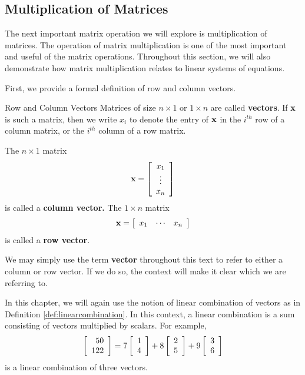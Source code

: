 \subsection{Multiplication of Matrices}

The next important matrix operation we will explore is multiplication
of matrices. The
operation of matrix multiplication is one of the most important and
useful of the matrix operations.  Throughout this section, we will
also demonstrate how matrix multiplication relates to linear systems
of equations.

First, we provide a formal definition of row and column vectors. 

\begin{definition}{Row and Column Vectors}\label{def:rowandcolumnvectors}
Matrices of size $n\times 1$ or $1\times n$ are called \textbf{vectors}. If $\mathbf{x}$ is such a matrix, then we write $x_{i}$ to 
denote the entry of $\mathbf{x}$ in the $i^{th}$ row of a column matrix, or the $i^{th}$ column of a row matrix. 

The $n\times 1$ matrix
\begin{equation*}
\mathbf{x}=\left[
\begin{array}{c}
x_{1} \\
\vdots \\
x_{n}
\end{array}
\right]
\end{equation*}
is called
 a \textbf{column vector.} The $1\times n$ matrix
\begin{equation*}
\mathbf{x} = \left[
\begin{array}{ccc}
x_{1} & \cdots & x_{n}
\end{array}
\right]
\end{equation*}
is called a \textbf{row vector}.
\end{definition}

We may simply use the term \textbf{vector} throughout this text to refer to either a column or row vector. 
If we do so, the context will make it clear which we are referring to.

In this chapter, we will again use the notion of linear combination of
vectors as in  Definition \ref{def:linearcombination}.  In this context, a linear combination is a sum
consisting of vectors multiplied by scalars.  For example,
\begin{equation*}
\left[
\begin{array}{r}
50 \\
122
\end{array}
\right]
=
7\left[
\begin{array}{r}
1 \\
4
\end{array}
\right] +8\left[
\begin{array}{r}
2 \\
5
\end{array}
\right] +9\left[
\begin{array}{r}
3 \\
6
\end{array}
\right]
\end{equation*}
is a linear combination of three vectors. 

